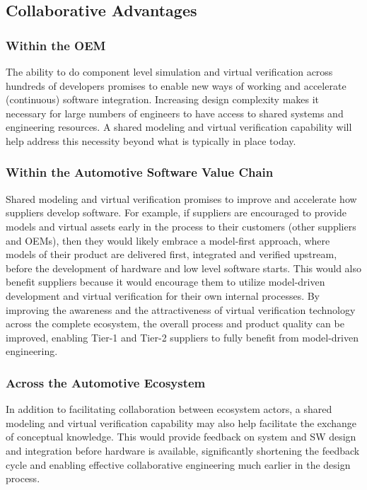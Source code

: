 \subsection{Collaborative Advantages}

\subsubsection{Within the OEM}
The ability to do component level simulation and virtual verification across hundreds of developers promises to enable new ways of working and accelerate (continuous) software integration.
Increasing design complexity makes it necessary for large numbers of engineers to have access to shared systems and engineering resources. A shared modeling and virtual verification capability will help address this necessity beyond what is typically in place today.

\subsubsection{Within the Automotive Software Value Chain}
Shared modeling and virtual verification promises to improve and accelerate how suppliers develop software. For example, if suppliers are encouraged to provide models and virtual assets early in the process to their customers (other suppliers and OEMs), then they would likely embrace a model-first approach, where models of their product are delivered first, integrated and verified upstream, before the development of hardware and low level software starts. This would also benefit suppliers because it would encourage them to utilize model-driven development and virtual verification for their own internal processes.
By improving the awareness and the attractiveness of virtual verification technology across the complete ecosystem, the overall process and product quality can be improved, enabling Tier-1 and Tier-2 suppliers to fully benefit from model-driven engineering.

\subsubsection{Across the Automotive Ecosystem}
In addition to facilitating collaboration between ecosystem actors, a shared modeling and virtual verification capability may also help facilitate the exchange of conceptual knowledge. This would provide feedback on system and SW design and integration before hardware is available, significantly shortening the feedback cycle and enabling effective collaborative engineering much earlier in the design process.

